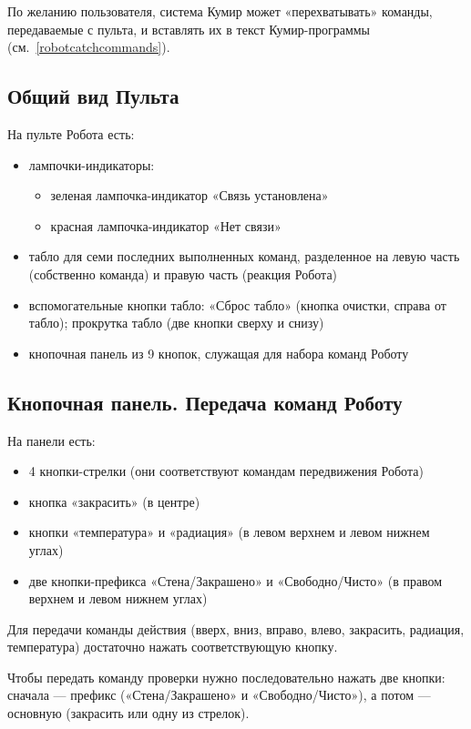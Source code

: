 \documentclass[12pt,a4paper]{article}
\begin{document}
По желанию пользователя, система Кумир может «перехватывать» команды, передаваемые с пульта, и вставлять их в текст Кумир-программы (см.~\ref{robotcatchcommands}).

\subsection{Общий вид Пульта}

На пульте Робота есть:
\begin{itemize}
\item лампочки-индикаторы:
	\begin{itemize}
	\item зеленая лампочка-индикатор «Связь установлена»
	\item красная лампочка-индикатор «Нет связи»
	\end{itemize}
\item табло для семи последних выполненных команд, разделенное на левую часть (собственно команда) и правую часть (реакция Робота)
\item вспомогательные кнопки табло: «Сброс табло» (кнопка очистки, справа от табло); прокрутка табло (две кнопки сверху и снизу)
\item кнопочная панель из 9 кнопок, служащая для набора команд Роботу
\end{itemize}

\subsection{Кнопочная панель. Передача команд Роботу}

На панели есть:
\begin{itemize}
\item 4 кнопки-стрелки (они соответствуют командам передвижения Робота)
\item кнопка «закрасить» (в центре)
\item кнопки «температура» и «радиация» (в левом верхнем и левом нижнем углах)
\item две кнопки-префикса «Стена/Закрашено» и «Свободно/Чисто» (в правом верхнем и левом нижнем углах)
\end{itemize}

Для передачи команды действия (вверх, вниз, вправо, влево, закрасить, радиация, температура) достаточно нажать соответствующую кнопку.

Чтобы передать команду проверки нужно последовательно нажать две кнопки: сначала --- префикс («Стена/Закрашено» и «Свободно/Чисто»), а потом --- основную (закрасить или одну из стрелок). 
\end{document}
